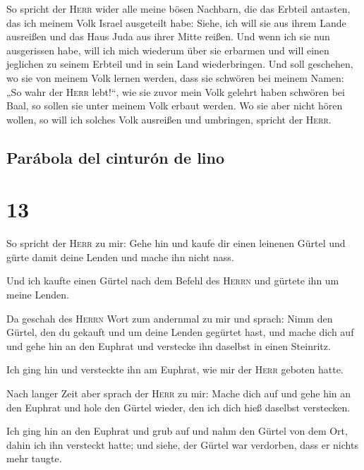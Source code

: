  So spricht der \textsc{Herr} wider alle meine bösen
Nachbarn, die das Erbteil antasten, das ich meinem Volk Israel
ausgeteilt habe: Siehe, ich will sie aus ihrem Lande ausreißen und das
Haus Juda aus ihrer Mitte reißen.  Und wenn ich sie nun
ausgerissen habe, will ich mich wiederum über sie erbarmen und will
einen jeglichen zu seinem Erbteil und in sein Land wiederbringen.
 Und soll geschehen, wo sie von meinem Volk lernen
werden, dass sie schwören bei meinem Namen: „So wahr der \textsc{Herr}
lebt!{}``, wie sie zuvor mein Volk gelehrt haben schwören bei Baal, so
sollen sie unter meinem Volk erbaut werden.  Wo sie aber
nicht hören wollen, so will ich solches Volk ausreißen und umbringen,
spricht der \textsc{Herr}.

\hypertarget{paruxe1bola-del-cinturuxf3n-de-lino}{%
\subsection{Parábola del cinturón de
lino}\label{paruxe1bola-del-cinturuxf3n-de-lino}}

\hypertarget{section-12}{%
\section{13}\label{section-12}}

 So spricht der \textsc{Herr} zu mir: Gehe hin und kaufe
dir einen leinenen Gürtel und gürte damit deine Lenden und mache ihn
nicht nass.

 Und ich kaufte einen Gürtel nach dem Befehl des
\textsc{Herrn} und gürtete ihn um meine Lenden.

 Da geschah des \textsc{Herrn} Wort zum andernmal zu mir
und sprach:  Nimm den Gürtel, den du gekauft und um deine
Lenden gegürtet hast, und mache dich auf und gehe hin an den Euphrat und
verstecke ihn daselbst in einen Steinritz.

 Ich ging hin und versteckte ihn am Euphrat, wie mir der
\textsc{Herr} geboten hatte.

 Nach langer Zeit aber sprach der \textsc{Herr} zu mir:
Mache dich auf und gehe hin an den Euphrat und hole den Gürtel wieder,
den ich dich hieß daselbst verstecken.

 Ich ging hin an den Euphrat und grub auf und nahm den
Gürtel von dem Ort, dahin ich ihn versteckt hatte; und siehe, der Gürtel
war verdorben, dass er nichts mehr taugte.

